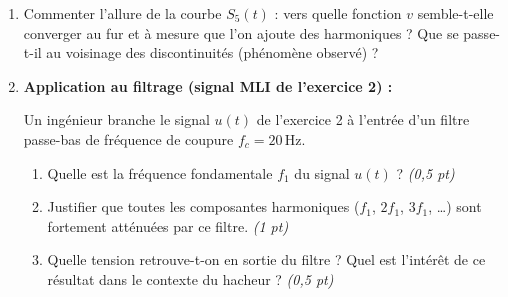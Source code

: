 \documentclass[a4paper,11pt]{article}
\begin{document}
\begin{enumerate}[label=\textbf{\arabic*.}]
  \item Commenter l'allure de la courbe $S_5(t)$ : vers quelle fonction $v$ semble-t-elle converger
        au fur et à mesure que l'on ajoute des harmoniques ? Que se passe-t-il au voisinage des
        discontinuités (phénomène observé) ?
  \begin{tcolorbox}[reponsebox, height=3cm]\end{tcolorbox}

  \item \textbf{Application au filtrage (signal MLI de l'exercice 2) :}

  Un ingénieur branche le signal $u(t)$ de l'exercice 2 à l'entrée d'un filtre passe-bas
  de fréquence de coupure $f_c = 20\,\mathrm{Hz}$.

  \begin{enumerate}[label=\textbf{\alph*.}]
    \item Quelle est la fréquence fondamentale $f_1$ du signal $u(t)$ ? \hfill \textit{(0,5 pt)}
    \begin{tcolorbox}[reponsebox, height=1.2cm]\end{tcolorbox}

    \item Justifier que toutes les composantes harmoniques ($f_1$, $2f_1$, $3f_1$, \ldots) sont
          fortement atténuées par ce filtre. \hfill \textit{(1 pt)}
    \begin{tcolorbox}[reponsebox, height=2cm]\end{tcolorbox}

    \item Quelle tension retrouve-t-on en sortie du filtre ? Quel est l'intérêt de ce résultat
          dans le contexte du hacheur ? \hfill \textit{(0,5 pt)}
    \begin{tcolorbox}[reponsebox, height=2cm]\end{tcolorbox}
  \end{enumerate}
\end{enumerate}
\end{document}
